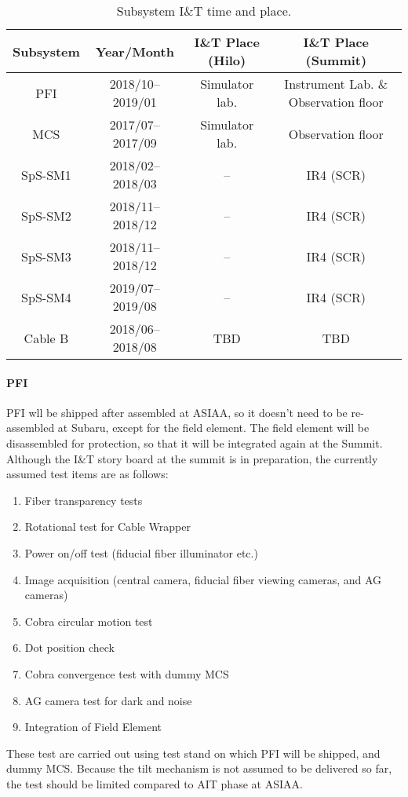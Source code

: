 \begin{table}[!ht]
\begin{center}
\caption{Subsystem I\&T time and place.}
\label{tbl:SubSysIandT} 
\begin{tabular}{*{4}{c}} \hline
Subsystem	& Year/Month & I\&T Place (Hilo) & I\&T Place (Summit) \\ \hline \hline
PFI	& 2018/10--2019/01		& Simulator lab.	& Instrument Lab. \& Observation floor \\
MCS	& 2017/07--2017/09	& Simulator lab.	& Observation floor \\
SpS-SM1	& 2018/02--2018/03		& -- 	& IR4 (SCR) \\
SpS-SM2	& 2018/11--2018/12		& --	 	& IR4 (SCR) \\
SpS-SM3	& 2018/11--2018/12		& -- 	& IR4 (SCR) \\
SpS-SM4	& 2019/07--2019/08		& -- 	& IR4 (SCR) \\
Cable B	&	2018/06--2018/08	& TBD	&TBD \\ \hline
\end{tabular} 
\end{center}
\end{table}

\paragraph{PFI}
PFI wll be shipped after assembled at ASIAA, so it doesn't need to be re-assembled at Subaru, except for the field element.
The field element will be disassembled for protection, so that it will be integrated again at the Summit.
Although the I\&T story board at the summit is in preparation, the currently assumed test items are as follows:
\begin{enumerate}
\item Fiber transparency tests
\item Rotational test for Cable Wrapper
\item Power on/off test (fiducial fiber illuminator etc.)
\item Image acquisition (central camera, fiducial fiber viewing cameras, and AG cameras)
\item Cobra circular motion test
\item Dot position check
\item Cobra convergence test with dummy MCS
\item AG camera test for dark and noise
\item Integration of Field Element
\end{enumerate}
These test are carried out using test stand on which PFI will be shipped, and dummy MCS.
Because the tilt mechanism is not assumed to be delivered so far, the test should be limited compared to AIT phase at ASIAA.


